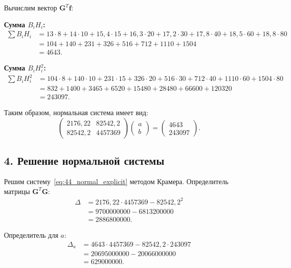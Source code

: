 \documentclass{article}
\begin{document}
Вычислим вектор $\mathbf{G}^T \mathbf{f}$:

\textbf{Сумма $B_i H_i$:}
\begin{align}
\sum B_i H_i &= 13 \cdot 8 + 14 \cdot 10 + 15{,}4 \cdot 15 + 16{,}3 \cdot 20 + 17{,}2 \cdot 30 + 17{,}8 \cdot 40 + 18{,}5 \cdot 60 + 18{,}8 \cdot 80 \nonumber \\
&= 104 + 140 + 231 + 326 + 516 + 712 + 1110 + 1504 \nonumber \\
&= 4643.
\end{align}

\textbf{Сумма $B_i H_i^2$:}
\begin{align}
\sum B_i H_i^2 &= 104 \cdot 8 + 140 \cdot 10 + 231 \cdot 15 + 326 \cdot 20 + 516 \cdot 30 + 712 \cdot 40 + 1110 \cdot 60 + 1504 \cdot 80 \nonumber \\
&= 832 + 1400 + 3465 + 6520 + 15480 + 28480 + 66600 + 120320 \nonumber \\
&= 243097.
\end{align}

Таким образом, нормальная система имеет вид:
\begin{equation}
\begin{pmatrix}
2176{,}22 & 82542{,}2 \\
82542{,}2 & 4457369
\end{pmatrix}
\begin{pmatrix}
a \\ b
\end{pmatrix}
=
\begin{pmatrix}
4643 \\ 243097
\end{pmatrix}.
\label{eq:44_normal_explicit}
\end{equation}

\subsection*{4. Решение нормальной системы}

Решим систему~\eqref{eq:44_normal_explicit} методом Крамера. Определитель матрицы $\mathbf{G}^T \mathbf{G}$:
\begin{align}
\Delta &= 2176{,}22 \cdot 4457369 - 82542{,}2^2 \nonumber \\
&= 9700000000 - 6813200000 \nonumber \\
&= 2886800000.
\end{align}

Определитель для $a$:
\begin{align}
\Delta_a &= 4643 \cdot 4457369 - 82542{,}2 \cdot 243097 \nonumber \\
&= 20695000000 - 20066000000 \nonumber \\
&= 629000000.
\end{align}
\end{document}
